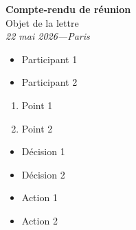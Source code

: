 \documentclass[a4paper,11pt,french]{quarto-lettre}
\newenvironment{div-participants}{%
  \section*{Participants}
}{\vspace{0.5em}}
\newenvironment{div-agenda}{%
  \section*{Ordre du jour}
}{\vspace{0.5em}}
\newenvironment{div-decisions}{%
  \section*{Décisions}
  \begin{leftbar}
}{\end{leftbar}\vspace{0.5em}}
\newenvironment{div-actions}{%
  \section*{Actions}
}{\vspace{0.5em}}
\begin{document}
\thispagestyle{firstpage}

\begin{center}
  {\LARGE\bfseries\sffamily Compte-rendu de réunion}\\[0.5em]
  {\large Objet de la lettre}\\[0.4em]
  {\itshape 22 mai 2026\enspace---\enspace{}Paris}\\[0.2em]
\end{center}

\vspace{1em}

\thispagestyle{firstpage}

\begin{div-participants}

\begin{itemize}
\tightlist
\item
  Participant 1
\item
  Participant 2
\end{itemize}

\end{div-participants}

\begin{div-agenda}

\begin{enumerate}
\def\labelenumi{\arabic{enumi}.}
\tightlist
\item
  Point 1
\item
  Point 2
\end{enumerate}

\end{div-agenda}

\begin{div-decisions}

\begin{itemize}
\tightlist
\item
  Décision 1
\item
  Décision 2
\end{itemize}

\end{div-decisions}

\begin{div-actions}

\begin{itemize}
\tightlist
\item
  Action 1
\item
  Action 2
\end{itemize}

\end{div-actions}
\end{document}
